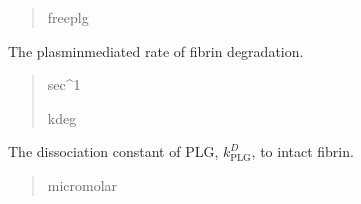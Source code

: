 \documentclass[letterpaper,10pt,english]{sphinxmanual}
\begin{document}
\begin{fulllineitems}
\begin{fulllineitems}
\begin{quote}
\begin{description}
\sphinxAtStartPar
freeplg

\end{description}\end{quote}

\end{fulllineitems}


\begin{fulllineitems}
\label{\detokenize{lysis.util:lysis.util.parameters.MicroParameters.deg_rate_fibrin}}
\pysigstartsignatures
{}
\pysigstopsignatures
\sphinxAtStartPar
The plasmin\sphinxhyphen{}mediated rate of fibrin degradation.
\begin{quote}\begin{description}
\sphinxAtStartPar
sec\textasciicircum{}\sphinxhyphen{}1

\sphinxAtStartPar
kdeg

\end{description}\end{quote}

\end{fulllineitems}


\begin{fulllineitems}
\label{\detokenize{lysis.util:lysis.util.parameters.MicroParameters.diss_const_PLG_intact}}
\pysigstartsignatures
{}
\pysigstopsignatures
\sphinxAtStartPar
The dissociation constant of PLG, \(k^D_\text{PLG}\), to intact fibrin.
\begin{quote}\begin{description}
\sphinxAtStartPar
micromolar


\end{description}
\end{quote}
\end{fulllineitems}
\end{fulllineitems}
\end{document}
